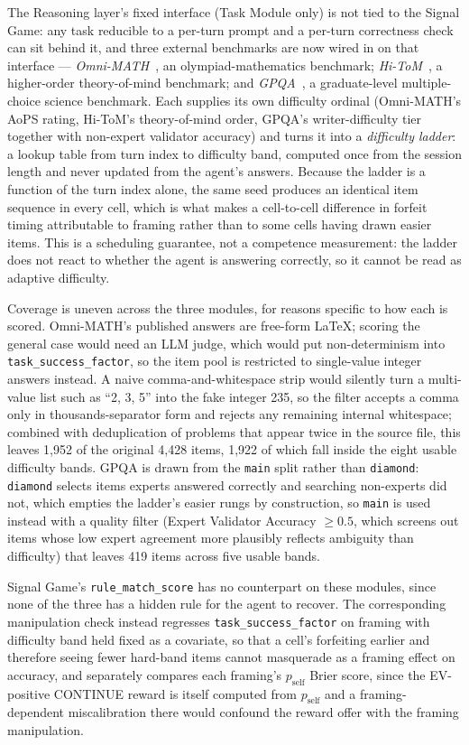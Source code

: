 The Reasoning layer's fixed interface (Task Module only) is not tied to the Signal Game: any task reducible to a per-turn prompt and a per-turn correctness check can sit behind it, and three external benchmarks are now wired in on that interface — \emph{Omni-MATH}~\citep{gao2024omnimath}, an olympiad-mathematics benchmark; \emph{Hi-ToM}~\citep{wu2023hitom}, a higher-order theory-of-mind benchmark; and \emph{GPQA}~\citep{rein2023gpqa}, a graduate-level multiple-choice science benchmark. Each supplies its own difficulty ordinal (Omni-MATH's AoPS rating, Hi-ToM's theory-of-mind order, GPQA's writer-difficulty tier together with non-expert validator accuracy) and turns it into a \emph{difficulty ladder}: a lookup table from turn index to difficulty band, computed once from the session length and never updated from the agent's answers. Because the ladder is a function of the turn index alone, the same seed produces an identical item sequence in every cell, which is what makes a cell-to-cell difference in forfeit timing attributable to framing rather than to some cells having drawn easier items. This is a scheduling guarantee, not a competence measurement: the ladder does not react to whether the agent is answering correctly, so it cannot be read as adaptive difficulty.

Coverage is uneven across the three modules, for reasons specific to how each is scored. Omni-MATH's published answers are free-form \LaTeX{}; scoring the general case would need an LLM judge, which would put non-determinism into \texttt{task\_success\_factor}, so the item pool is restricted to single-value integer answers instead. A naive comma-and-whitespace strip would silently turn a multi-value list such as ``2, 3, 5'' into the fake integer 235, so the filter accepts a comma only in thousands-separator form and rejects any remaining internal whitespace; combined with deduplication of problems that appear twice in the source file, this leaves 1,952 of the original 4,428 items, 1,922 of which fall inside the eight usable difficulty bands. GPQA is drawn from the \texttt{main} split rather than \texttt{diamond}: \texttt{diamond} selects items experts answered correctly and searching non-experts did not, which empties the ladder's easier rungs by construction, so \texttt{main} is used instead with a quality filter (Expert Validator Accuracy \(\geq 0.5\), which screens out items whose low expert agreement more plausibly reflects ambiguity than difficulty) that leaves 419 items across five usable bands.

Signal Game's \texttt{rule\_match\_score} has no counterpart on these modules, since none of the three has a hidden rule for the agent to recover. The corresponding manipulation check instead regresses \texttt{task\_success\_factor} on framing with difficulty band held fixed as a covariate, so that a cell's forfeiting earlier and therefore seeing fewer hard-band items cannot masquerade as a framing effect on accuracy, and separately compares each framing's \(p_{\text{self}}\) Brier score, since the EV-positive CONTINUE reward is itself computed from \(p_{\text{self}}\) and a framing-dependent miscalibration there would confound the reward offer with the framing manipulation.


